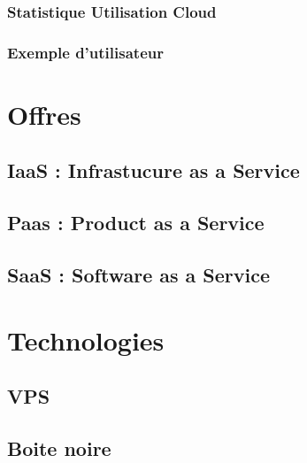 \documentclass[11pt]{book}
\begin{document}
\subsubsection{Statistique Utilisation Cloud}\label{sec-statistique-utilisation-cloud}%

\subsubsection{Exemple d'utilisateur}\label{sec-exemple-dutilisateur}%

\section{Offres}\label{sec-offres}%

\subsection{IaaS : Infrastucure as a Service}\label{sec-iaas---infrastucure-as-a-service}%

\subsection{Paas : Product as a Service}\label{sec-paas---product-as-a-service}%

\subsection{SaaS    : Software as a Service}\label{sec-saas---software-as-a-service}%

\section{Technologies}\label{sec-technologies}%

\subsection{VPS}\label{sec-vps}%

\subsection{Boite noire}\label{sec-boite-noire}%
\end{document}
